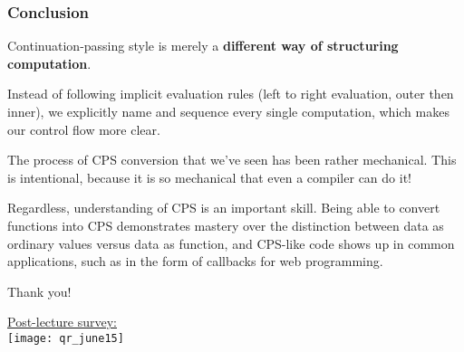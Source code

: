 \documentclass[aspectratio=169, handout]{beamer}
\begin{document}
\begin{frame}[fragile]
  \frametitle{Conclusion}

  Continuation-passing style is merely a \textbf{different way of structuring
  computation}.
  
  \pause
  \vspace{\fill}

  Instead of following implicit evaluation rules (left to right evaluation,
  outer then inner), we explicitly name and sequence every single computation,
  which makes our control flow more clear.

  \pause
  \vspace{\fill}

  The process of CPS conversion that we've seen has been rather mechanical. This
  is intentional, because it is so mechanical that even a compiler can do it!

  \pause
  \vspace{\fill}

  Regardless, understanding of CPS is an important skill. Being able to convert functions
  into CPS demonstrates mastery over the distinction between data as 
  ordinary values versus data as function, and CPS-like code shows up in common
  applications, such as in the form of callbacks for web programming.
\end{frame}

\begin{frame}[plain]
	\begin{center} Thank you! \end{center}

	\begin{center} 
    {\color{blue} \href{https://docs.google.com/forms/d/e/1FAIpQLScUJiDK78X4rvW6k1fuNN3RcfmBpH_kn_C7xeh3yMCBcyugQg/viewform?usp=sf_link}{Post-lecture survey:}} \\
    \vspace{5pt}
    \texttt{[image: qr\_june15]}
  \end{center}
\end{frame}
\end{document}
